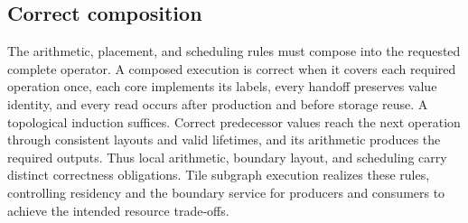 \subsection{Correct composition}
The arithmetic, placement, and scheduling rules must compose into the
requested complete operator.
A composed execution is correct when it covers each required operation once,
each core implements its labels, every handoff preserves value identity, and
every read occurs after production and before storage reuse. A topological
induction suffices. Correct predecessor values reach the next operation through
consistent layouts and valid lifetimes, and its arithmetic produces the
required outputs. Thus local arithmetic, boundary layout, and scheduling
carry distinct correctness obligations. Tile subgraph execution realizes these
rules, controlling residency and the boundary service for producers and
consumers to achieve the intended resource trade-offs.

